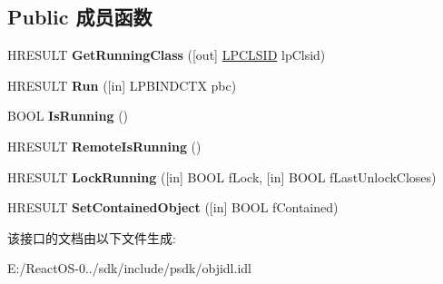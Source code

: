 \subsection*{Public 成员函数}
\begin{DoxyCompactItemize}
\item 
\mbox{\label{interface_i_runnable_object_aca34344408074c6043cd57f554ce74a7}} 
H\+R\+E\+S\+U\+LT {\bfseries Get\+Running\+Class} (\mbox{[}out\mbox{]} \hyperlink{interface_g_u_i_d}{L\+P\+C\+L\+S\+ID} lp\+Clsid)
\item 
\mbox{\label{interface_i_runnable_object_a1f7ee283f10f89ed8ac748714a1b883e}} 
H\+R\+E\+S\+U\+LT {\bfseries Run} (\mbox{[}in\mbox{]} L\+P\+B\+I\+N\+D\+C\+TX pbc)
\item 
\mbox{\label{interface_i_runnable_object_a6b51f8418cb3e7c2dc228432f07fdb66}} 
B\+O\+OL {\bfseries Is\+Running} ()
\item 
\mbox{\label{interface_i_runnable_object_a3f651a70009bcb04240f801c0b90cd97}} 
H\+R\+E\+S\+U\+LT {\bfseries Remote\+Is\+Running} ()
\item 
\mbox{\label{interface_i_runnable_object_a72ad6dd85267b6758304b7e976e451c2}} 
H\+R\+E\+S\+U\+LT {\bfseries Lock\+Running} (\mbox{[}in\mbox{]} B\+O\+OL f\+Lock, \mbox{[}in\mbox{]} B\+O\+OL f\+Last\+Unlock\+Closes)
\item 
\mbox{\label{interface_i_runnable_object_aaaf172812260afb3056f7dda13be6254}} 
H\+R\+E\+S\+U\+LT {\bfseries Set\+Contained\+Object} (\mbox{[}in\mbox{]} B\+O\+OL f\+Contained)
\end{DoxyCompactItemize}


该接口的文档由以下文件生成\+:\begin{DoxyCompactItemize}
\item 
E\+:/\+React\+O\+S-\/0../sdk/include/psdk/objidl.\+idl\end{DoxyCompactItemize}
